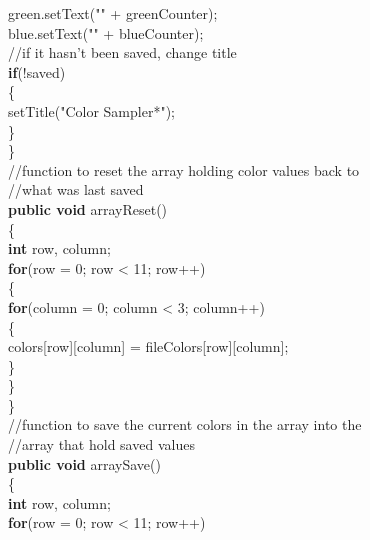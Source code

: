 \documentclass[12pt]{article}
\begin{document}
\begin{flushleft}
{\qquad \qquad \qquad \qquad					green.setText("" + greenCounter);\\
\qquad \qquad \qquad \qquad					blue.setText("" + blueCounter);\\
				[2mm]
\qquad \qquad \qquad \qquad					//if it hasn't been saved, change title\\
\qquad \qquad \qquad \qquad					\textbf{if}(!saved)\\
\qquad \qquad \qquad \qquad					\{\\
\qquad \qquad \qquad \qquad \qquad					setTitle("Color Sampler*");\\
\qquad \qquad \qquad \qquad					\}\\
\qquad \qquad \qquad			\}\\
			[2mm]
\qquad \qquad \qquad			//function to reset the array holding color values back to\\
\qquad \qquad \qquad //what was last saved\\
\qquad \qquad \qquad			\textbf{public void} arrayReset()\\
\qquad \qquad \qquad			\{\\
\qquad \qquad \qquad \qquad				\textbf{int} row, column;\\
				[2mm]
\qquad \qquad \qquad \qquad				\textbf{for}(row = 0; row < 11; row++)\\
\qquad \qquad \qquad \qquad				\{\\
\qquad \qquad \qquad \qquad \qquad					\textbf{for}(column = 0; column < 3; column++)\\
\qquad \qquad \qquad \qquad \qquad					\{\\
\qquad \qquad \qquad \qquad \qquad \qquad					colors[row][column] = fileColors[row][column];\\
\qquad \qquad \qquad \qquad \qquad					\}\\
\qquad \qquad \qquad \qquad 				\}\\
\qquad \qquad \qquad			\}\\
			[2mm]
\qquad \qquad \qquad			//function to save the current colors in the array into the\\ 
\qquad \qquad \qquad//array that hold saved values\\
\qquad \qquad \qquad			\textbf{public void} arraySave()\\
\qquad \qquad \qquad			\{\\
\qquad \qquad \qquad \qquad \qquad				\textbf{int} row, column;\\
				[2mm]
\qquad \qquad \qquad \qquad \qquad				\textbf{for}(row = 0; row < 11; row++)\\
}
\end{flushleft}
\end{document}
